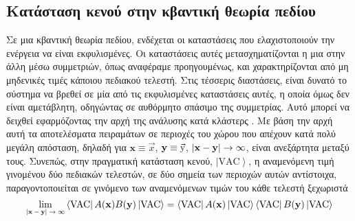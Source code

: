 \subsection{Κατάσταση κενού στην κβαντική θεωρία πεδίου}
Σε μια κβαντική θεωρία πεδίου, ενδέχεται οι καταστάσεις που ελαχιστοποιούν την ενέργεια να είναι εκφυλισμένες. Οι καταστάσεις αυτές μετασχηματίζονται η μια στην άλλη μέσω συμμετριών, όπως αναφέραμε προηγουμένως, και χαρακτηρίζονται από μη μηδενικές τιμές κάποιου πεδιακού τελεστή.
Στις τέσσερις διαστάσεις, είναι δυνατό το σύστημα να βρεθεί σε 
μία από τις εκφυλισμένες καταστάσεις αυτές, η οποία όμως δεν είναι αμετάβλητη, 
οδηγώντας σε αυθόρμητο σπάσιμο της συμμετρίας. Αυτό μπορεί να δειχθεί εφαρμόζοντας την αρχή της ανάλυσης κατά κλάστερς \cite{weinberg_1996}.
Με βάση την αρχή αυτή τα αποτελέσματα πειραμάτων  
σε περιοχές 
του χώρου που απέχουν κατά πολύ μεγάλη απόσταση, δηλαδή για $\mathbf{x}\equiv \Vec{x}$, $\mathbf{\text{\textbf{y}}}\equiv \Vec{\text{y}}$, $|\mathbf{x}-\text{\textbf{y}}|\rightarrow\infty$, είναι ανεξάρτητα μεταξύ τους. Συνεπώς, στην πραγματική κατάσταση κενού, $\left|\text{VAC}\right>$, η αναμενόμενη τιμή γινομένου δύο πεδιακών τελεστών, σε δύο σημεία των περιοχών αυτών αντίστοιχα, παραγοντοποιείται σε γινόμενο των αναμενόμενων τιμών του κάθε τελεστή ξεχωριστά \cite{weinberg_1996}
\begin{equation}
    \lim\subscr{|\mathbf{x}-\text{\textbf{y}}|\rightarrow\infty}\left<\text{VAC}\right|A(\mathbf{x})B(\text{\textbf{y}})\left|\text{VAC}\right>=\left<\text{VAC}\right|A(\mathbf{x})\left|\text{VAC}\right>\left<\text{VAC}\right|B(\text{\textbf{y}})\left|\text{VAC}\right> \label{clusters}
\end{equation}
\\

